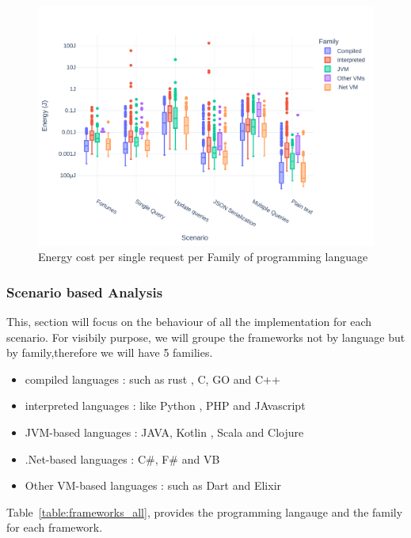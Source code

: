 \begin{figure}[bht]
    \centering
    \includegraphics[width=.8\columnwidth ]{imgs/all_boxplot}
    \caption{Energy cost per single request per Family of programming language}
    \label{fig:all_boxplot}
\end{figure}



\subsubsection{Scenario based Analysis}
This, section will focus on the behaviour of all the implementation for each scenario. For visibily purpose, we will groupe the frameworks not by language but by family,therefore we will have 5 families.
\begin{itemize}
    \item compiled languages : such as rust , C, GO and C++
    \item interpreted languages : like Python , PHP and JAvascript
    \item JVM-based languages : JAVA, Kotlin , Scala and Clojure
    \item .Net-based languages : C\#, F\# and VB
    \item Other VM-based languages : such as Dart and Elixir
\end{itemize}

Table~\ref{table:frameworks_all}, provides the programming langauge and the family for each framework.

